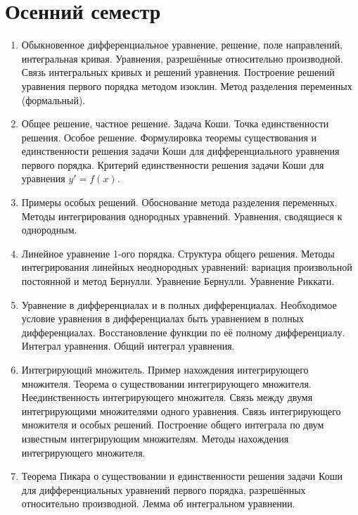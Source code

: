 \documentclass{article}
\begin{document}
\section{Осенний семестр}
\begin{enumerate}
    \item Обыкновенное дифференциальное уравнение, решение, поле направлений, интегральная кривая. Уравнения, разрешённые относительно производной. Связь интегральных кривых и решений уравнения. Построение решений уравнения первого порядка методом изоклин. Метод разделения переменных (формальный).

    \item Общее решение, частное решение. Задача Коши. Точка единственности решения. Особое решение. Формулировка теоремы существования и единственности решения задачи Коши для дифференциального уравнения первого порядка. Критерий единственности решения задачи Коши для уравнения $y'=f(x)$.

    \item Примеры особых решений. Обоснование метода разделения переменных. Методы интегрирования однородных уравнений. Уравнения, сводящиеся к однородным. 

    \item Линейное уравнение 1-ого порядка. Структура общего решения. Методы интегрирования линейных неоднородных уравнений: вариация произвольной постоянной и метод Бернулли. Уравнение Бернулли. Уравнение Риккати.

    \item Уравнение в дифференциалах и в полных дифференциалах. Необходимое условие уравнения в дифференциалах быть уравнением в полных дифференциалах. Восстановление функции по её полному дифференциалу. Интеграл уравнения. Общий интеграл уравнения.

    \item Интегрирующий множитель. Пример нахождения интегрирующего множителя. Теорема о существовании интегрирующего множителя. Неединственность интегрирующего множителя. Связь между двумя интегрирующими множителями одного уравнения. Связь интегрирующего множителя и особых решений. Построение общего интеграла по двум известным интегрирующим множителям. Методы нахождения интегрирующего множителя.

    \item Теорема Пикара о существовании и единственности решения задачи Коши для дифференциальных уравнений первого порядка, разрешённых относительно производной. Лемма об интегральном уравнении.


\end{enumerate}
\end{document}
